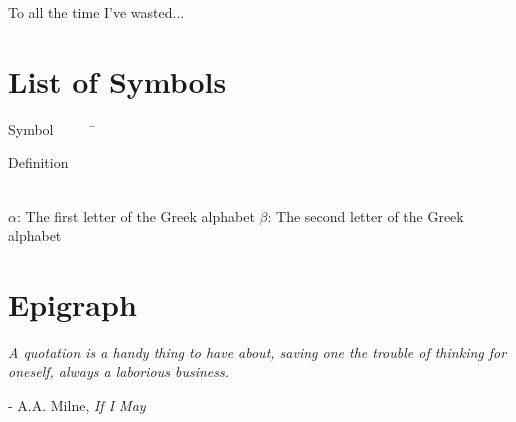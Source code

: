 \documentclass{ucalgarythesis}
\theoremstyle{plain}
\theoremstyle{definition}
\begin{document}
  \begin{dedication}
     To all the time I've wasted...
  \end{dedication}


  \tableofcontents

  \listoffigures
  
  \listoftables
  
  \chapter{List of Symbols}      
  \begin{tabbing}
    Symbol~~~~~\= \ \ \ \ \ \ \ \ \ \ \ \ \ \ \ \ \ \ \ \ \ \ \ \ \ \ \ \ \ \ \ \ \ \ \ \  \parbox{5in}{Definition}\\

    \addsymbol \mbox{$\alpha$}: {The first letter of the Greek alphabet}
    \addsymbol \mbox{$\beta$}: {The second letter of the Greek alphabet}
  \end{tabbing}
  
%

  \chapter{Epigraph}

  \begin{epiquote} 
   \textit{A quotation is a handy thing to have about, saving one the trouble of thinking for oneself, always a laborious business.} 
  \end{epiquote}    
  \begin{flushright} - A.A. Milne, \textit{If I May}\end{flushright}\bigskip
   
\end{document}
